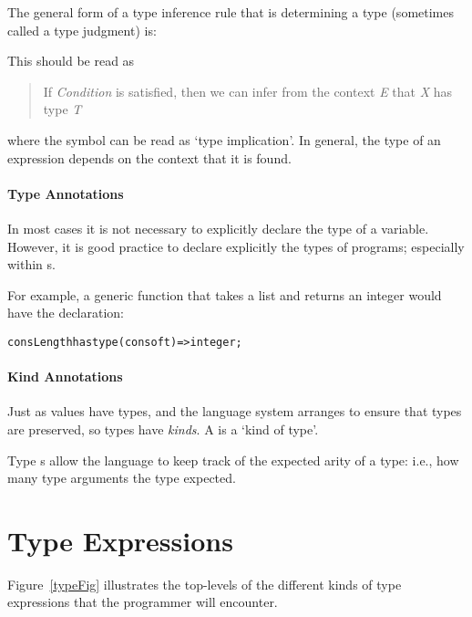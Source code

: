 The general form of a type inference rule that is determining a type (sometimes called a type judgment) is:
\begin{prooftree}
\end{prooftree}
This should be read as
\begin{quote}
If \emph{Condition} is satisfied, then we can infer from the context \emph{E} that \emph{X} has type \emph{T}
\end{quote}
where the symbol \tinfers{} can be read as `type implication'. In general, the type of an expression depends on the context that it is found. 

\paragraph{Type Annotations}
In most cases it is not necessary to explicitly declare the type of a variable. However, it is good practice to declare explicitly the types of programs; especially within s.

For example, a generic function  that takes a  list and returns an integer would have the declaration:
\begin{alltt}
consLength has type (cons of \pcent{}t)=>integer;
\end{alltt}

\paragraph{Kind Annotations}
\label{kindAnnotation}
Just as values have types, and the language system arranges to ensure that types are preserved, so types have \emph{kinds}. A  is a `kind of type'.

\begin{aside}
Type s allow the language to keep track of the expected arity of a type: i.e., how many type arguments the type expected.
\end{aside}

\section{Type Expressions}
\label{typeExpressions}

Figure~\vref{typeFig} illustrates the top-levels of the different kinds of type expressions that the \Sr programmer will encounter.

